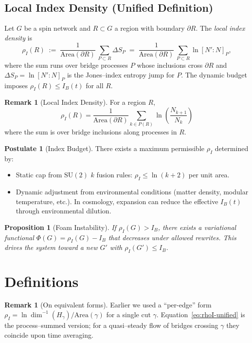 \documentclass[11pt]{article}
\theoremstyle{plain}
\newtheorem{proposition}[theorem]{Proposition}
\theoremstyle{definition}
\newtheorem{remark}[theorem]{Remark}
\newtheorem{postulate}[theorem]{Postulate}
\newcommand{\Inv}{^{-1}} %
\begin{document}
\subsection{Local Index Density (Unified Definition)}\label{subsec:rhoI-unified}
Let $G$ be a spin network and $R\subset G$ a region with boundary $\partial R$. The \emph{local index density} is
\begin{equation}
  \rho_I(R)
  \;:=\;
  \frac{1}{\mathrm{Area}(\partial R)}\,
  \sum_{P\subset R} \Delta S_P
  \;=\;
  \frac{1}{\mathrm{Area}(\partial R)}\,
  \sum_{P\subset R} \ln [N':N]_P,
  \label{eq:rhoI-unified}
\end{equation}
where the sum runs over bridge processes $P$ whose inclusions cross $\partial R$ and $\Delta S_P=\ln [N':N]_P$ is the Jones–index entropy jump for $P$. The dynamic budget imposes $\rho_I(R)\le I_B(t)$ for all $R$.
\begin{remark}[Local Index Density]
  For a region $R$,
  \begin{equation}
    \rho_I(R) = \frac{1}{\mathrm{Area}(\partial R)} \sum_{k \in P(R)} \ln \left( \frac{N_{k+1}}{N_k} \right)
  \end{equation}
  where the sum is over bridge inclusions along processes in $R$.
\end{remark}

\begin{postulate}[Index Budget]
  There exists a maximum permissible $\rho_I$ determined by:
  \begin{itemize}
    \item Static cap from $\mathrm{SU}(2)$ $k$ fusion rules: $\rho_I \le \ln(k+2)$ per unit area.
    \item Dynamic adjustment from environmental conditions (matter density, modular temperature, etc.). In cosmology, expansion can reduce the effective $I_B(t)$ through environmental dilution.
  \end{itemize}
\end{postulate}

\begin{proposition}[Foam Instability]
  If $\rho_I(G) > I_B$, there exists a variational functional $\Phi(G) = \rho_I(G) - I_B$ that decreases under allowed rewrites. This drives the system toward a new $G'$ with $\rho_I(G') \le I_B$.
\end{proposition}

\section{Definitions}
\begin{remark}[On equivalent forms]
  Earlier we used a “per-edge” form $\rho_I = \ln\dim\Inv(H_\gamma)/\mathrm{Area}(\gamma)$ for a single cut $\gamma$. Equation~\eqref{eq:rhoI-unified} is the process–summed version; for a quasi–steady flow of bridges crossing $\gamma$ they coincide upon time averaging.
\end{remark}
\end{document}
